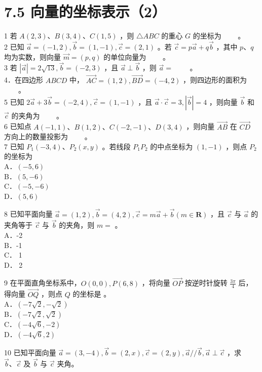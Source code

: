 \documentclass[10pt]{article}
\begin{document}
\section*{7.5 向量的坐标表示（2）}
1 若 \(A(2,3) 、 B(3,4) 、 C(1,5)\) ，则 \(\triangle A B C\) 的重心 \(G\) 的坐标为 \(\qquad\)。\\
2 已知 \(\vec{a}=(-1,2), \vec{b}=(1,-1), \vec{c}=(2,1)\) 。若 \(\vec{c}=p \vec{a}+q \vec{b}\) ，其中 \(p 、 q\) 均为实数，则向量 \(\vec{m}=(p, q)\) 的单位向量为 \(\qquad\)。\\
3 若 \(|\vec{a}|=2 \sqrt{13}, \vec{b}=(-2,3)\) ，且 \(\vec{a} \perp \vec{b}\) ，则 \(\vec{a}=\) \(\qquad\)。\\
4．在四边形 \(A B C D\) 中， \(\overrightarrow{A C}=(1,2), \overrightarrow{B D}=(-4,2)\) ，则四边形的面积为 \(\qquad\)。\\
5 已知 \(2 \vec{a}+3 \vec{b}=(-2,4), \vec{c}=(1,-1)\) ，且 \(\vec{a} \cdot \vec{c}=3,|\vec{b}|=4\) ，则向量 \(\vec{b}\) 和 \(\vec{c}\) 的夹角为 \(\qquad\)。\\
6 已知点 \(A(-1,1) 、 B(1,2) 、 C(-2,-1) 、 D(3,4)\) ，则向量 \(\overrightarrow{A B}\) 在 \(\overrightarrow{C D}\) 方向上的数量投影为 \(\qquad\)。\\
7 已知 \(P_{1}(-3,4) 、 P_{2}(x, y)\) 。若线段 \(P_{1} P_{2}\) 的中点坐标为 \((1,-1)\) ，则点 \(P_{2}\) 的坐标为\\
A．\((-5,6)\)\\
B．\((5,-6)\)\\
C．\((-5,-6)\)\\
D．\((5,6)\)

8 已知平面向量 \(\vec{a}=(1,2), \vec{b}=(4,2), \vec{c}=m \vec{a}+\vec{b}(m \in \mathbf{R})\) ，且 \(\vec{c}\) 与 \(\vec{a}\) 的夹角等于 \(\vec{c}\) 与 \(\vec{b}\) 的夹角，则 \(m=\) 。\\
A．-2\\
B．-1\\
C． 1\\
D． 2

9 在平面直角坐标系中，\(O(0,0), P(6,8)\) ，将向量 \(\overrightarrow{O P}\) 按逆时针旋转 \(\frac{3 \pi}{4}\) 后，得向量 \(\overrightarrow{O Q}\) ，则点 \(Q\) 的坐标是 。\\
A．\((-7 \sqrt{2},-\sqrt{2})\)\\
B．\((-7 \sqrt{2}, \sqrt{2})\)\\
C．\((-4 \sqrt{6},-2)\)\\
D．\((-4 \sqrt{6}, 2)\)

10 已知平面向量 \(\vec{a}=(3,-4), \vec{b}=(2, x), \vec{c}=(2, y), \vec{a} / / \vec{b}, \vec{a} \perp \vec{c}\) ，求 \(\vec{b} 、 \vec{c}\) 及 \(\vec{b}\) 与 \(\vec{c}\) 夹角。
\end{document}
